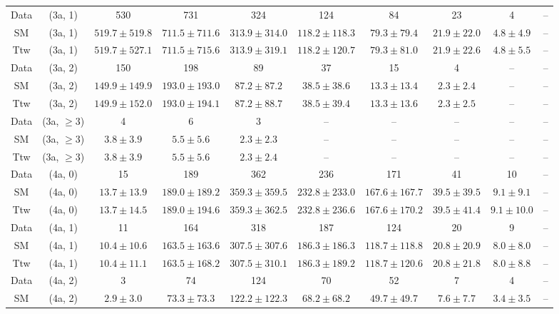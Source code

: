\begin{table}[h!]
{\begin{tabular}{cccccccccc}
	Data & (3a, 1) & 530 & 731 & 324 & 124 & 84 & 23 & 4 & -- \\[0.5ex] 
	SM & (3a, 1) & $519.7\pm 519.8$ & $711.5\pm 711.6$ & $313.9\pm 314.0$ & $118.2\pm 118.3$ & $79.3\pm 79.4$ & $21.9\pm 22.0$ & $4.8\pm 4.9$ & -- \\[0.5ex] 
	Ttw & (3a, 1) & $519.7\pm 527.1$ & $711.5\pm 715.6$ & $313.9\pm 319.1$ & $118.2\pm 120.7$ & $79.3\pm 81.0$ & $21.9\pm 22.6$ & $4.8\pm 5.5$ & -- \\[0.5ex] 
	Data & (3a, 2) & 150 & 198 & 89 & 37 & 15 & 4 & -- & -- \\[0.5ex] 
	SM & (3a, 2) & $149.9\pm 149.9$ & $193.0\pm 193.0$ & $87.2\pm 87.2$ & $38.5\pm 38.6$ & $13.3\pm 13.4$ & $2.3\pm 2.4$ & -- & -- \\[0.5ex] 
	Ttw & (3a, 2) & $149.9\pm 152.0$ & $193.0\pm 194.1$ & $87.2\pm 88.7$ & $38.5\pm 39.4$ & $13.3\pm 13.6$ & $2.3\pm 2.5$ & -- & -- \\[0.5ex] 
	Data & (3a, $\ge3$) & 4 & 6 & 3 & -- & -- & -- & -- & -- \\[0.5ex] 
	SM & (3a, $\ge3$) & $3.8\pm 3.9$ & $5.5\pm 5.6$ & $2.3\pm 2.3$ & -- & -- & -- & -- & -- \\[0.5ex] 
	Ttw & (3a, $\ge3$) & $3.8\pm 3.9$ & $5.5\pm 5.6$ & $2.3\pm 2.4$ & -- & -- & -- & -- & -- \\[0.5ex] 
	Data & (4a, 0) & 15 & 189 & 362 & 236 & 171 & 41 & 10 & -- \\[0.5ex] 
	SM & (4a, 0) & $13.7\pm 13.9$ & $189.0\pm 189.2$ & $359.3\pm 359.5$ & $232.8\pm 233.0$ & $167.6\pm 167.7$ & $39.5\pm 39.5$ & $9.1\pm 9.1$ & -- \\[0.5ex] 
	Ttw & (4a, 0) & $13.7\pm 14.5$ & $189.0\pm 194.6$ & $359.3\pm 362.5$ & $232.8\pm 236.6$ & $167.6\pm 170.2$ & $39.5\pm 41.4$ & $9.1\pm 10.0$ & -- \\[0.5ex] 
	Data & (4a, 1) & 11 & 164 & 318 & 187 & 124 & 20 & 9 & -- \\[0.5ex] 
	SM & (4a, 1) & $10.4\pm 10.6$ & $163.5\pm 163.6$ & $307.5\pm 307.6$ & $186.3\pm 186.3$ & $118.7\pm 118.8$ & $20.8\pm 20.9$ & $8.0\pm 8.0$ & -- \\[0.5ex] 
	Ttw & (4a, 1) & $10.4\pm 11.1$ & $163.5\pm 168.2$ & $307.5\pm 310.1$ & $186.3\pm 189.2$ & $118.7\pm 120.6$ & $20.8\pm 21.8$ & $8.0\pm 8.8$ & -- \\[0.5ex] 
	Data & (4a, 2) & 3 & 74 & 124 & 70 & 52 & 7 & 4 & -- \\[0.5ex] 
	SM & (4a, 2) & $2.9\pm 3.0$ & $73.3\pm 73.3$ & $122.2\pm 122.3$ & $68.2\pm 68.2$ & $49.7\pm 49.7$ & $7.6\pm 7.7$ & $3.4\pm 3.5$ & -- \\[0.5ex] 

\end{tabular}}
\end{table}
